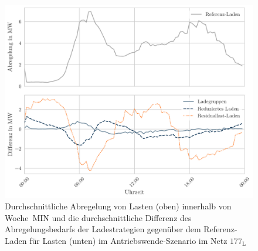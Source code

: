 \begin{figure}[H]
    \centering
    \includegraphics[width=\textwidth]{Bilder/177_load_diff}
    \caption[Durchschnittliche Abregelung von Lasten innerhalb von Woche~MIN und die durchschnittliche Differenz des Abregelungsbedarfs der Ladestrategien gegenüber dem Referenz-Laden für Lasten im Antriebswende-Szenario im Netz \num{177}]{Durchschnittliche Abregelung von Lasten (oben) innerhalb von Woche~MIN und die durchschnittliche Differenz des Abregelungsbedarfs der Ladestrategien gegenüber dem Referenz-Laden für Lasten (unten) im Antriebswende-Szenario im Netz \(177_{\text{L}}\)}\label{fig:177_load_diff}
\end{figure}